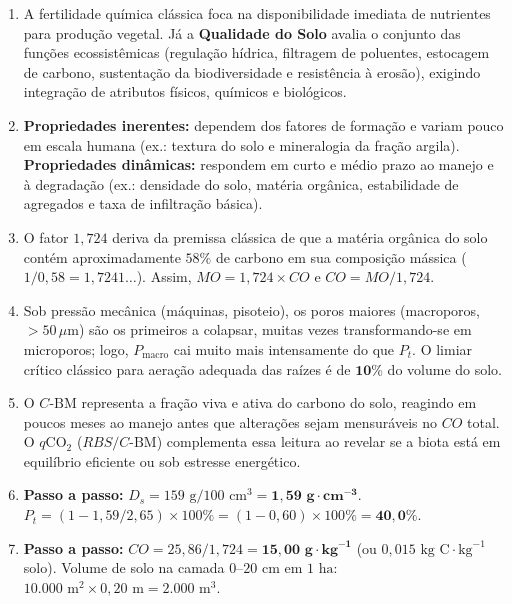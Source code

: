 \clearpage
{}

\begin{boxGabarito}
\begin{enumerate}[leftmargin=1.6em, itemsep=4pt]
  \item A fertilidade química clássica foca na disponibilidade imediata de nutrientes para produção vegetal. Já a \textbf{Qualidade do Solo} avalia o conjunto das funções ecossistêmicas (regulação hídrica, filtragem de poluentes, estocagem de carbono, sustentação da biodiversidade e resistência à erosão), exigindo integração de atributos físicos, químicos e biológicos.
  \item \textbf{Propriedades inerentes:} dependem dos fatores de formação e variam pouco em escala humana (ex.: textura do solo e mineralogia da fração argila). \textbf{Propriedades dinâmicas:} respondem em curto e médio prazo ao manejo e à degradação (ex.: densidade do solo, matéria orgânica, estabilidade de agregados e taxa de infiltração básica).
  \item O fator $1{,}724$ deriva da premissa clássica de que a matéria orgânica do solo contém aproximadamente $58\%$ de carbono em sua composição mássica ($1 / 0{,}58 = 1{,}7241\dots$). Assim, $MO = 1{,}724 \times CO$ e $CO = MO / 1{,}724$.
  \item Sob pressão mecânica (máquinas, pisoteio), os poros maiores (macroporos, $>50\,\mu\text{m}$) são os primeiros a colapsar, muitas vezes transformando-se em microporos; logo, $P_{\text{macro}}$ cai muito mais intensamente do que $P_t$. O limiar crítico clássico para aeração adequada das raízes é de $\mathbf{10\%}$ do volume do solo.
  \item O $C\text{-BM}$ representa a fração viva e ativa do carbono do solo, reagindo em poucos meses ao manejo antes que alterações sejam mensuráveis no $CO$ total. O $q\text{CO}_2$ ($RBS / C\text{-BM}$) complementa essa leitura ao revelar se a biota está em equilíbrio eficiente ou sob estresse energético.
  \item \textbf{Passo a passo:}
  $D_s = 159\text{ g} / 100\text{ cm}^3 = \mathbf{1{,}59\text{ g}\cdot\text{cm}^{-3}}$.
  $P_t = (1 - 1{,}59 / 2{,}65)\times 100\% = (1 - 0{,}60)\times 100\% = \mathbf{40{,}0\%}$.
  \item \textbf{Passo a passo:}
  $CO = 25{,}86 / 1{,}724 = \mathbf{15{,}00\text{ g}\cdot\text{kg}^{-1}}$ (ou $0{,}015\text{ kg C}\cdot\text{kg}^{-1}$ solo).
  Volume de solo na camada $0$--$20\text{ cm}$ em $1\text{ ha}$: $10.000\text{ m}^2 \times 0{,}20\text{ m} = 2.000\text{ m}^3$.

\end{enumerate}
\end{boxGabarito}
